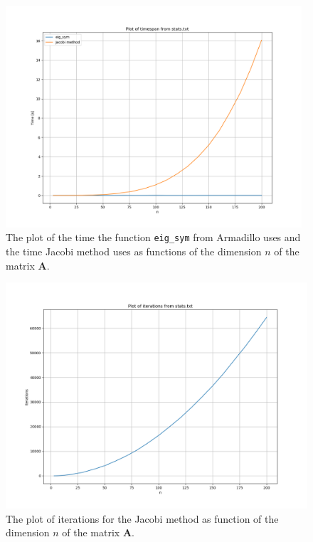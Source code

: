 \documentclass{article}
\begin{document}
  \begin{figure}[ht]
    \centering
    \includegraphics[width = 11cm]{timespan-stats.png}
    \caption{The plot of the time the function \texttt{eig\_sym} from Armadillo uses and the time Jacobi method uses as functions of the dimension $n$ of the matrix \textbf{A}. }
    \label{fig:timespanpng}
  \end{figure}


\iffalse
  \begin{figure}
    \includegraphics[width=\linewidth]{iterations-stats.png}
    \caption{The plot of iterations for the Jacobi method as function of the dimension $n$ of the matrix \textbf{A}. }
    \label{fig:iterationspngnei}
  \end{figure}
\end{document}
